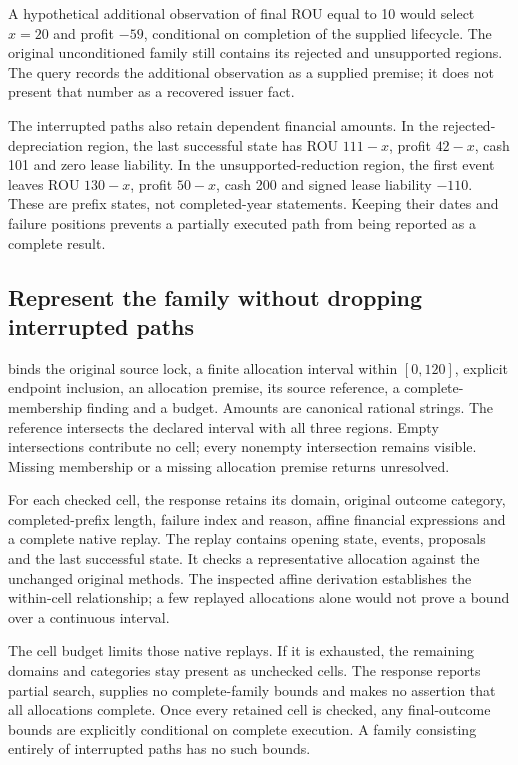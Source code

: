 A hypothetical additional observation of final ROU equal to 10 would select
$x=20$ and profit $-59$, conditional on completion of the supplied lifecycle.
The original unconditioned family still contains its rejected and unsupported
regions. The query records the additional observation as a supplied premise;
it does not present that number as a recovered issuer fact.

The interrupted paths also retain dependent financial amounts. In the
rejected-depreciation region, the last successful state has ROU $111-x$, profit
$42-x$, cash 101 and zero lease liability. In the unsupported-reduction region,
the first event leaves ROU $130-x$, profit $50-x$, cash 200 and signed lease
liability $-110$. These are prefix states, not completed-year statements. Keeping
their dates and failure positions prevents a partially executed path from being
reported as a complete result.

\subsection{Represent the family without dropping interrupted paths}

 binds the original source lock, a finite
allocation interval within $[0,120]$, explicit endpoint inclusion, an allocation
premise, its source reference, a complete-membership finding and a
 budget. Amounts are canonical rational strings. The reference
intersects the declared interval with all three regions. Empty intersections
contribute no cell; every nonempty intersection remains visible. Missing
membership or a missing allocation premise returns unresolved.

For each checked cell, the response retains its domain, original outcome
category, completed-prefix length, failure index and reason, affine financial
expressions and a complete native replay. The replay contains opening state,
events, proposals and the last successful state. It checks a representative
allocation against the unchanged original methods. The inspected affine
derivation establishes the within-cell relationship; a few replayed allocations
alone would not prove a bound over a continuous interval.

The cell budget limits those native replays. If it is exhausted, the remaining
domains and categories stay present as unchecked cells. The response reports
partial search, supplies no complete-family bounds and makes no assertion that
all allocations complete. Once every retained cell is checked, any final-outcome
bounds are explicitly conditional on complete execution. A family consisting
entirely of interrupted paths has no such bounds.

